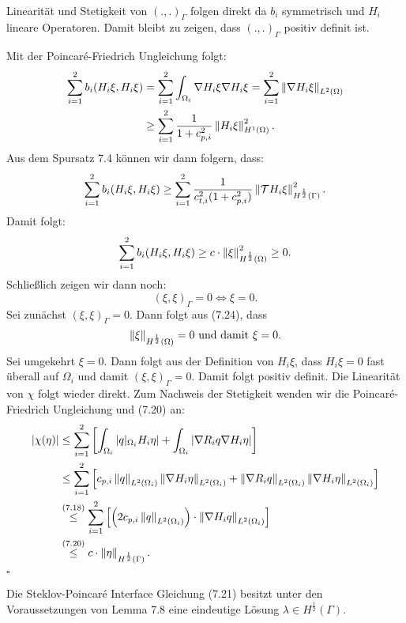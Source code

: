 \\
Linearität und Stetigkeit von $(.,.)_\Gamma$ folgen direkt da $b_i$ symmetrisch und $H_i$ lineare Operatoren.
Damit bleibt zu zeigen, dass $(.,.)_\Gamma$ positiv definit ist.

Mit der Poincaré-Friedrich Ungleichung folgt:
\begin{align*}
\sum_{i=1}^2 b_i(H_i\xi,H_i\xi) &= \sum_{i=1}^2 \int_{\Omega_i} \nabla H_i\xi \nabla H_i\xi = \sum_{i=1}^2 \left\Vert\nabla H_i\xi\right\Vert_{L^2(\Omega)}\\
&\ge \sum_{i=1}^2 \frac{1}{1+ c_{p,i}^2} \left\Vert H_i\xi\right\Vert_{H^1(\Omega)}^2.
\end{align*}
Aus dem Spursatz 7.4 können wir dann folgern, dass:
\[
\sum_{i=1}^2 b_i(H_i\xi,H_i\xi) \ge \sum_{i=1}^2 \frac{1}{c_{t,i}^2(1+ c_{p,i}^2)} \left\Vert\mathcal{T}H_i\xi\right\Vert_{H^{\frac{1}{2}}(\Gamma)}^2.
\]
Damit folgt:
\begin{align}
\sum_{i=1}^2 b_i(H_i\xi,H_i\xi) \ge c\cdot \left\Vert\xi\right\Vert_{H^{\frac{1}{2}}(\Omega)}^2 \ge 0.
\end{align}
Schließlich zeigen wir dann noch:
\[
(\xi,\xi)_\Gamma = 0 \Leftrightarrow \xi=0.
\]
Sei zunächst $(\xi,\xi)_\Gamma = 0$.
Dann folgt aus (7.24), dass
\[
\left\Vert\xi\right\Vert_{H^{\frac{1}{2}}(\Omega)} = 0 \text{ und damit } \xi = 0.
\]
Sei umgekehrt $\xi=0$.
Dann folgt aus der Definition von $H_i\xi$, dass $H_i\xi = 0$ fast überall auf $\Omega_i$ und damit $(\xi,\xi)_\Gamma=0$.
Damit folgt positiv definit.
Die Linearität von $\chi$ folgt wieder direkt.
Zum Nachweis der Stetigkeit wenden wir die Poincaré-Friedrich Ungleichung und (7.20) an:
\begin{align*}
\left\vert\chi(\eta)\right\vert &\le \sum_{i=1}^2 \left[\int_{\Omega_i} \left\vert q|_{\Omega_i} H_i\eta\right\vert + \int_{\Omega_i} \left\vert\nabla R_i q \nabla H_i\eta\right\vert \right]\\
&\le \sum_{i=1}^2 \left[c_{p,i} \left\Vert q\right\Vert_{L^2(\Omega_i)} \left\Vert\nabla H_i\eta\right\Vert_{L^2(\Omega_i)} + \left\Vert\nabla R_i q\right\Vert_{L^2(\Omega_i)} \left\Vert\nabla H_i\eta\right\Vert_{L^2(\Omega_i)} \right]\\
&\stackrel{(7.18)}{\le} \sum_{i=1}^2 \left[\left( 2c_{p,i} \left\Vert q\right\Vert_{L^2(\Omega_i)}\right)\cdot \left\Vert\nabla H_i q\right\Vert_{L^2(\Omega_i)} \right]\\
&\stackrel{(7.20)}{\le} c\cdot \left\Vert\eta\right\Vert_{H^{\frac{1}{2}}(\Gamma)}.
\end{align*}
\hfill $\square$

Die Steklov-Poincaré Interface Gleichung (7.21) besitzt unter den Voraussetzungen von Lemma 7.8 eine eindeutige Lösung $\lambda\in H^{\frac{1}{2}}(\Gamma)$.\\

